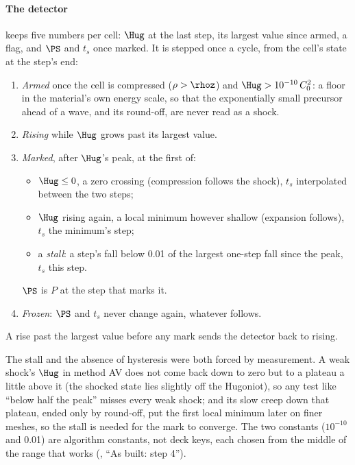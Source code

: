 \paragraph{The detector} keeps five numbers per cell: $\Hug$ at the last
step, its largest value since armed, a flag, and $\PS$ and $t_s$ once
marked. It is stepped once a cycle, from the cell's state at the step's end:
\begin{enumerate}
\item \emph{Armed} once the cell is compressed ($\rho > \rhoz$) and $\Hug >
  10^{-10}\,C_0^2$: a floor in the material's own energy scale, so that the
  exponentially small precursor ahead of a wave, and its round-off, are never
  read as a shock.
\item \emph{Rising} while $\Hug$ grows past its largest value.
\item \emph{Marked}, after $\Hug$'s peak, at the first of:
  \begin{itemize}
  \item $\Hug \le 0$, a zero crossing (compression follows the shock), $t_s$
    interpolated between the two steps;
  \item $\Hug$ rising again, a local minimum however shallow (expansion
    follows), $t_s$ the minimum's step;
  \item a \emph{stall}: a step's fall below 0.01 of the largest one-step fall
    since the peak, $t_s$ this step.
  \end{itemize}
  $\PS$ is $P$ at the step that marks it.
\item \emph{Frozen}: $\PS$ and $t_s$ never change again, whatever follows.
\end{enumerate}
A rise past the largest value before any mark sends the detector back to
rising.

The stall and the absence of hysteresis were both forced by measurement. A
weak shock's $\Hug$ in method AV does not come back down to zero but to a
plateau a little above it (the shocked state lies slightly off the
Hugoniot), so any test like ``below half the peak'' misses every weak shock;
and its slow creep down that plateau, ended only by round-off, put the first
local minimum later on finer meshes, so the stall is needed for the mark to
converge. The two constants ($10^{-10}$ and 0.01) are algorithm constants,
not deck keys, each chosen from the middle of the range that works
(, ``As built: step 4'').

